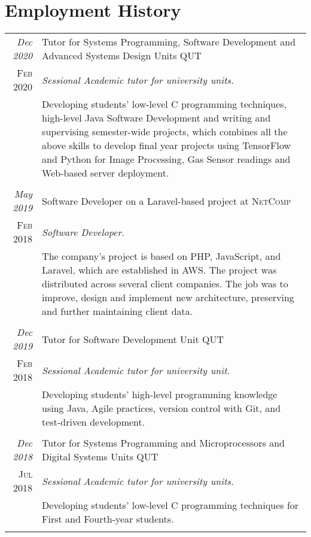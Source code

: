 \documentclass[a4paper,12pt]{article}
\begin{document}
\section{Employment History}
\begin{tabular}{r|p{11cm}}
    \emph{Dec 2020} &Tutor for Systems Programming, Software Development and Advanced Systems Design Units \textsc{QUT} \\\textsc{Feb 2020}&\emph{Sessional Academic tutor for university units.}\\&\footnotesize{Developing students' low-level C programming techniques, high-level Java Software Development and writing and supervising semester-wide projects, which combines all the above skills to develop final year projects using TensorFlow and Python for Image Processing, Gas Sensor readings and Web-based server deployment.}\\\multicolumn{2}{c}{} \\ [1pc]
	
	\emph{May 2019} & Software Developer on a Laravel-based project at \textsc{NetComp} \\\textsc{Feb 2018}&\emph{Software Developer.}\\&\footnotesize{The company's project is based on PHP, JavaScript, and Laravel, which are established in AWS. The project was distributed across several client companies. The job was to improve, design and implement new architecture, preserving and further maintaining client data.}\\\multicolumn{2}{c}{} \\ [1pc]
	
	\emph{Dec 2019} &Tutor for Software Development Unit \textsc{QUT} \\\textsc{Feb 2018}&\emph{Sessional Academic tutor for university unit.}\\&\footnotesize{Developing students' high-level programming knowledge using Java, Agile practices, version control with Git, and test-driven development.}\\\multicolumn{2}{c}{} \\ [1pc]
	
	\emph{Dec 2018} &Tutor for Systems Programming and Microprocessors and Digital Systems Units \textsc{QUT} \\\textsc{Jul 2018}&\emph{Sessional Academic tutor for university units.}\\&\footnotesize{Developing students' low-level C programming techniques for First and Fourth-year students.}\\\multicolumn{2}{c}{} \\ [1pc]
	

\end{tabular}
\end{document}
